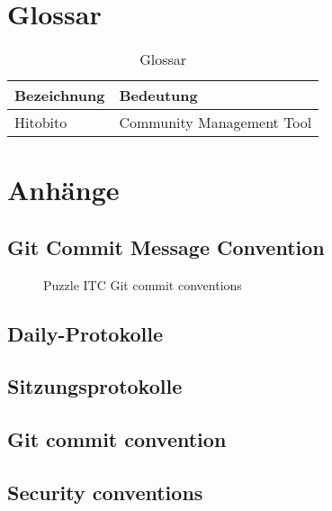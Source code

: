 \chapter{Glossar}

\begin{table}[H]
    \begin{tabular}{|L{0.3\textwidth}|L{0.6\textwidth}|}
        \hline
         \textbf{\color{white}Bezeichnung} & \textbf{\color{white}Bedeutung} \\[12pt]
        \hline
        Hitobito & Community Management Tool \\
        \hline
    \end{tabular}
    \caption{Glossar}
\end{table}

\chapter{Anhänge}

\section{Git Commit Message Convention}
\label{sec:gitconv}
\begin{figure}[h]
    \centering
    \caption{Puzzle ITC Git commit conventions}
\end{figure}

\section{Daily-Protokolle}
\label{sec:dailyprot}

\section{Sitzungsprotokolle}

\section{Git commit convention}
\section{Security conventions}





